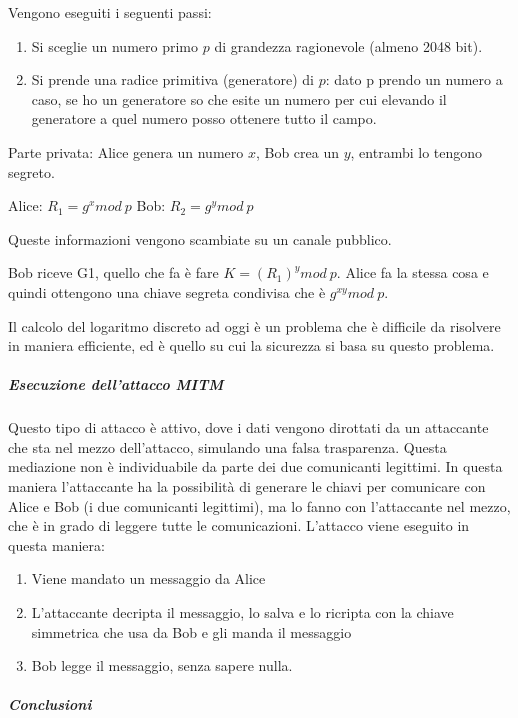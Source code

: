 Vengono eseguiti i seguenti passi:

\begin{enumerate}
 \item Si sceglie un numero primo $p$ di grandezza ragionevole (almeno 2048 
 bit).
 \item Si prende una radice primitiva (generatore) di $p$: dato p prendo un 
 numero a caso, se ho un generatore so che esite un numero per cui elevando il 
 generatore a quel numero posso ottenere tutto il campo.
\end{enumerate}


Parte privata: Alice genera un numero $x$, Bob crea un $y$, entrambi lo tengono 
segreto.

Alice: $R_1 = g^x mod\ p$
Bob: $R_2 = g^y mod\ p$

Queste informazioni vengono scambiate su un canale pubblico.

Bob riceve G1, quello che fa è fare $K = (R_1)^y mod\ p$. Alice fa la stessa 
cosa e quindi ottengono una chiave segreta condivisa che è $g^{xy} mod\ p$.

Il calcolo del logaritmo discreto ad oggi è un problema che è difficile da 
risolvere in maniera efficiente, ed è quello su cui la sicurezza si basa su 
questo problema.

\subparagraph{Esecuzione dell'attacco MITM}

Questo tipo di attacco è attivo, dove i dati vengono dirottati da un attaccante 
che sta nel mezzo dell'attacco, simulando una falsa trasparenza. Questa 
mediazione non è individuabile da parte dei due comunicanti legittimi. In 
questa maniera l'attaccante ha la possibilità di generare le chiavi per 
comunicare con Alice e Bob (i due comunicanti legittimi), ma lo fanno con 
l'attaccante nel mezzo, che è in grado di leggere tutte le comunicazioni.
L'attacco viene eseguito in questa maniera:
\begin{enumerate}
\item Viene mandato un messaggio da Alice
\item L'attaccante decripta il messaggio, lo salva e lo ricripta con la chiave 
simmetrica che usa da Bob e gli manda il messaggio
\item Bob legge il messaggio, senza sapere nulla.
\end{enumerate}


\subparagraph{Conclusioni}

